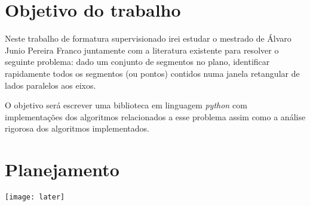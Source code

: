 \documentclass[10pt,twoside,a4paper]{article}
\begin{document}
\section{Objetivo do trabalho}

Neste trabalho de formatura supervisionado irei estudar o mestrado de Álvaro Junio Pereira Franco \cite{alvaro} juntamente com a literatura existente para resolver o seguinte problema: dado um conjunto de segmentos no plano, identificar rapidamente todos os segmentos (ou pontos) contidos numa janela retangular de lados paralelos aos eixos. \par O objetivo será escrever uma biblioteca em linguagem \textit{python} com implementações dos algoritmos relacionados a esse problema assim como a análise rigorosa dos algoritmos implementados.

\section{Planejamento}
\texttt{[image: later]}
{}


\end{document}
